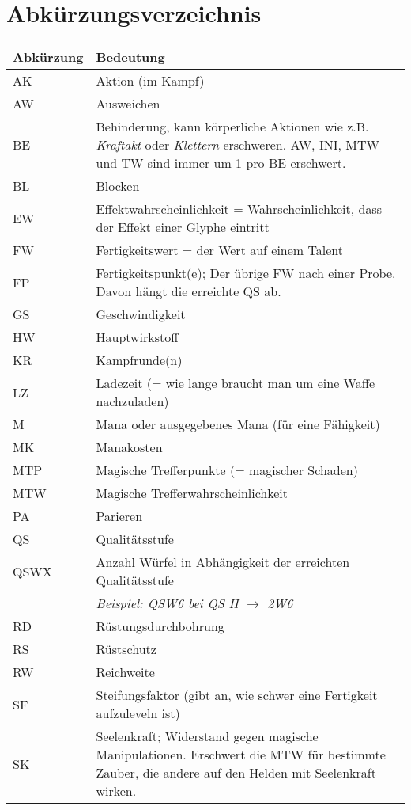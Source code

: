 \chapter{Abkürzungsverzeichnis}
\begin{longtable}{|p{}|p{}|}
\hline
\textbf{Abkürzung} & \textbf{Bedeutung} \\ \hline
AK & Aktion (im Kampf) \\ \hline
AW & Ausweichen \\ \hline
BE & Behinderung, kann körperliche Aktionen wie z.B. \textit{Kraftakt} oder \textit{Klettern} erschweren. AW, INI, MTW und TW sind immer um 1 pro BE erschwert. \\ \hline
BL & Blocken \\ \hline
EW & Effektwahrscheinlichkeit = Wahrscheinlichkeit, dass der Effekt einer Glyphe eintritt \\ \hline
FW & Fertigkeitswert = der Wert auf einem Talent \\ \hline
FP & Fertigkeitspunkt(e); Der übrige FW nach einer Probe. Davon hängt die erreichte QS ab. \\ \hline
GS & Geschwindigkeit \\ \hline
HW & Hauptwirkstoff \\ \hline
KR & Kampfrunde(n) \\ \hline
LZ & Ladezeit (= wie lange braucht man um eine Waffe nachzuladen) \\ \hline
M & Mana oder ausgegebenes Mana (für eine Fähigkeit) \\ \hline
MK & Manakosten \\ \hline
MTP & Magische Trefferpunkte (= magischer Schaden) \\ \hline
MTW & Magische Trefferwahrscheinlichkeit \\ \hline
PA & Parieren \\ \hline
QS & Qualitätsstufe \\ \hline
QSWX & Anzahl Würfel in Abhängigkeit der erreichten Qualitätsstufe \\
& \textit{Beispiel: QSW6 bei QS II $\rightarrow$ 2W6} \\ \hline
RD & Rüstungsdurchbohrung \\ \hline
RS & Rüstschutz \\ \hline
RW & Reichweite \\ \hline
SF & Steifungsfaktor (gibt an, wie schwer eine Fertigkeit aufzuleveln ist) \\ \hline
SK & Seelenkraft; Widerstand gegen magische Manipulationen. Erschwert die MTW für bestimmte Zauber, die andere auf den Helden mit Seelenkraft wirken. \\ \hline

\end{longtable}
